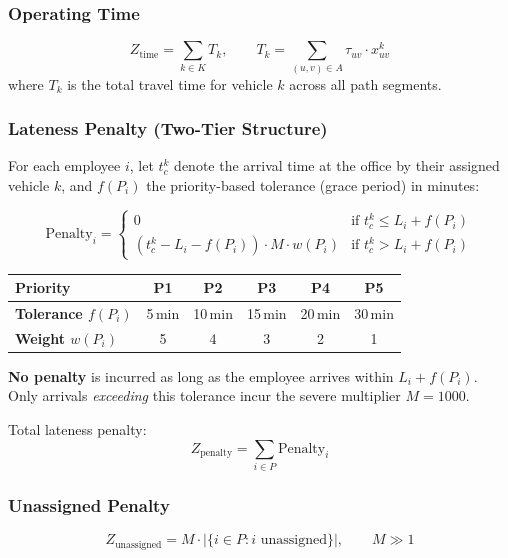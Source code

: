\documentclass[11pt,a4paper]{article}
\begin{document}
\subsubsection{Operating Time}
\begin{equation}
Z_{\text{time}} = \sum_{k \in K} T_k, \qquad
T_k = \sum_{(u,v) \in A} \tau_{uv} \cdot x_{uv}^k
\end{equation}
where $T_k$ is the total travel time for vehicle $k$ across all path segments.

\subsubsection{Lateness Penalty (Two-Tier Structure)}

For each employee $i$, let $t_c^k$ denote the arrival time at the office by their assigned vehicle $k$, and $f(P_i)$ the priority-based tolerance (grace period) in minutes:

\begin{equation}
\text{Penalty}_i = 
\begin{cases}
0 & \text{if } t_c^k \leq L_i + f(P_i) \\[4pt]
(t_c^k - L_i - f(P_i)) \cdot M \cdot w(P_i) & \text{if } t_c^k > L_i + f(P_i)
\end{cases}
\end{equation}

\begin{insightbox}
\begin{tabular}{lccccc}
\toprule
\textbf{Priority} & P1 & P2 & P3 & P4 & P5 \\
\midrule
\textbf{Tolerance $f(P_i)$} & 5\,min & 10\,min & 15\,min & 20\,min & 30\,min \\
\textbf{Weight $w(P_i)$} & 5 & 4 & 3 & 2 & 1 \\
\bottomrule
\end{tabular}

\vspace{4pt}
\textbf{No penalty} is incurred as long as the employee arrives within $L_i + f(P_i)$. Only arrivals \emph{exceeding} this tolerance incur the severe multiplier $M = 1000$.
\end{insightbox}

Total lateness penalty:
\begin{equation}
Z_{\text{penalty}} = \sum_{i\in P} \text{Penalty}_i
\end{equation}

\subsubsection{Unassigned Penalty}
\begin{equation}
Z_{\text{unassigned}} = M \cdot |\{i \in P : i \text{ unassigned}\}|,\qquad M \gg 1
\end{equation}
\end{document}
